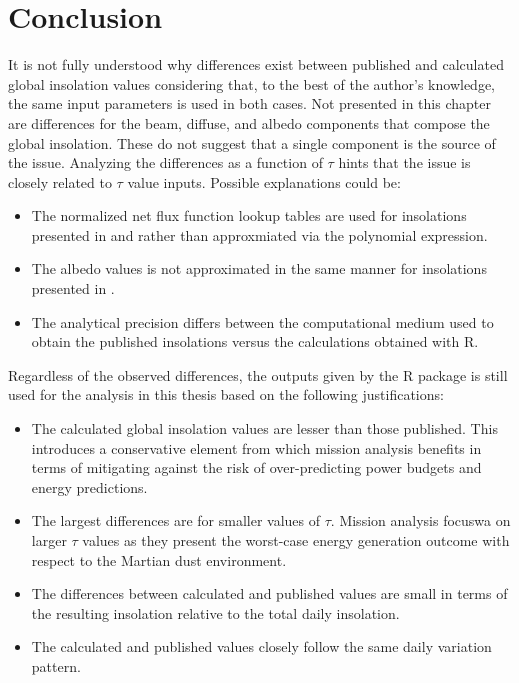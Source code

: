 \section{Conclusion}
It is not fully understood why differences exist between published and calculated global insolation values considering that, to the best of the author's knowledge, the same input parameters is used in both cases. Not presented in this chapter are differences for the beam, diffuse, and albedo components that compose the global insolation. These do not suggest that a single component is the source of the issue. Analyzing the differences as a function of $\tau$ hints that the issue is closely related to $\tau$ value inputs. Possible explanations could be:
\begin{itemize}
    \item The normalized net flux function lookup tables are used for insolations presented in  and  rather than approxmiated via the polynomial expression.
    \item The albedo values is not approximated in the same manner for insolations presented in .
    \item The analytical precision differs between the computational medium used to obtain the published insolations versus the calculations obtained with R.
\end{itemize}

Regardless of the observed differences, the outputs given by the R package is still used for the analysis in this thesis based on the following justifications:
\begin{itemize}
  \item The calculated global insolation values are lesser than those published. This introduces a conservative element from which mission analysis benefits in terms of mitigating against the risk of over-predicting power budgets and energy predictions.
  \item The largest differences are for smaller values of $\tau$. Mission analysis focuswa on larger $\tau$ values as they present the worst-case energy generation outcome with respect to the Martian dust environment.
  \item The differences between calculated and published values are small in terms of the resulting insolation relative to the total daily insolation.
  \item The calculated and published values closely follow the same daily variation pattern.
\end{itemize}
